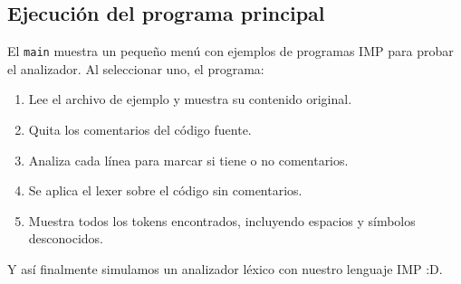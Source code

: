 \subsection*{Ejecución del programa principal}
El \texttt{main} muestra un pequeño menú con ejemplos de programas IMP para probar el analizador.  
Al seleccionar uno, el programa:
\begin{enumerate}
  \item Lee el archivo de ejemplo y muestra su contenido original.
  \item Quita los comentarios del código fuente.
  \item Analiza cada línea para marcar si tiene o no comentarios.
  \item Se aplica el lexer sobre el código sin comentarios.
  \item Muestra todos los tokens encontrados, incluyendo espacios y símbolos desconocidos.
\end{enumerate}

Y así finalmente simulamos un analizador léxico con nuestro lenguaje IMP :D.